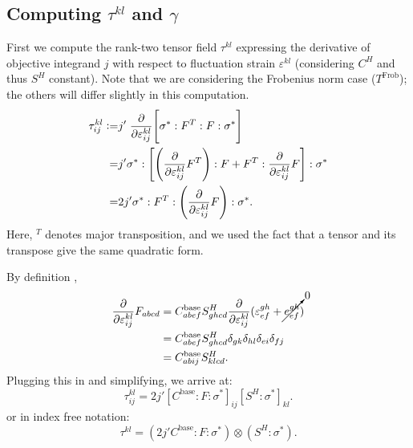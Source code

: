 \documentclass[10pt]{article}
\providecommand{\pder}[2]{\frac{\partial #1}{\partial #2}}
\newcommand\pr[1]{\prettyref{#1}}
\def\strain{\varepsilon}
\newcommand{\defeq}{\vcentcolon=}
\begin{document}
\subsection{Computing \texorpdfstring{$\tau^{kl}$}{Tau\textasciicircum kl} and \texorpdfstring{$\gamma$}{Gamma}}
\label{sec:tau}
First we compute the rank-two tensor field $\tau^{kl}$ expressing the
derivative of objective integrand $j$ with respect to fluctuation strain
$\strain^{kl}$ (considering $C^H$ and thus $S^H$ constant). Note that we are
considering the Frobenius norm case ($T^\text{Frob}$); the others will differ
slightly in this computation.
\begin{align*}
    \tau^{kl}_{ij} \defeq& j' \left. \pder{}{\strain^{kl}_{ij}} \middle[ \sigma^* : F^T : F : \sigma^* \right] \\
    =& j'  \sigma^* : \left[\left(\pder{}{\strain^{kl}_{ij}} F^T \right) : F + F^T : \pder{}{\strain^{kl}_{ij}}F \right] : \sigma^* \\
    =& 2 j'  \sigma^* : F^T : \left( \pder{}{\strain^{kl}_{ij}}F \right) : \sigma^*.
\end{align*}
Here, $^T$ denotes major transposition, and we used the fact that a tensor
and its transpose give the same quadratic form.

By definition \pr{eqn:macro_micro},
\begin{align*}
    \pder{}{\strain^{kl}_{ij}} F_{abcd} &= C^\text{base}_{abef} S^H_{ghcd} \pder{}{\strain^{kl}_{ij}} (\strain^{gh}_{ef} + \cancelto{0}{e^{gh}_{ef}}) \\
                                        &= C^\text{base}_{abef} S^H_{ghcd} \delta_{gk} \delta_{hl} \delta_{ei} \delta_{fj} \\
                                        &= C^\text{base}_{abij} S^H_{klcd}.
\end{align*}
Plugging this in and simplifying, we arrive at:
\begin{equation*}
        \tau^{kl}_{ij} = 2 j' [C^\text{base} : F : \sigma^*]_{ij} [S^H : \sigma^*]_{kl}.
\end{equation*}
or in index free notation:
\begin{equation}
\label{eqn:tau}
\boxed{
    \tau^{kl} = (2 j' C^\text{base} : F : \sigma^*) \otimes (S^H : \sigma^*).
}
\end{equation}
\end{document}
